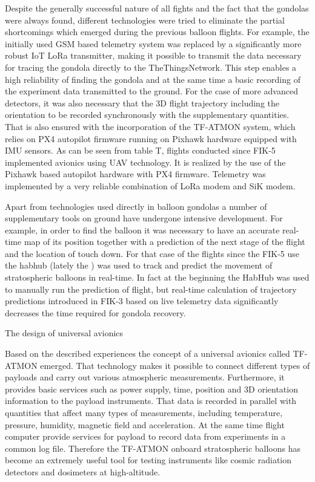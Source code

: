 Despite the generally successful nature of all fights and the fact that the gondolas were always found, different technologies were tried to eliminate the partial shortcomings which emerged during the previous balloon flights. For example, the initially used GSM based telemetry system was replaced by a significantly more robust IoT LoRa transmitter, making it possible to transmit the data necessary for tracing the gondola directly to the TheThingsNetwork. This step enables a high reliability of finding the gondola and at the same time a basic recording of the experiment data transmitted to the ground. For the case of more advanced detectors, it was also necessary that the 3D flight trajectory including the orientation to be recorded synchronously with the supplementary quantities. That is also ensured with the incorporation of the TF-ATMON system, which relies on PX4 autopilot firmware running on Pixhawk hardware equipped with IMU sensors. As can be seen from table T, flights conducted since FIK-5 implemented avionics using UAV technology. It is realized by the use of the Pixhawk based autopilot hardware with PX4 firmware. Telemetry was implemented by a very reliable combination of LoRa modem and SiK modem. 

Apart from technologies used directly in balloon  gondolas a number of supplementary tools on ground have undergone intensive development. For example, in order to find the balloon it was necessary to have an accurate real-time map of its position together with a prediction of the next stage of the flight and the location of touch down. For that case of the flights since the FIK-5 use the habhub  (lately the ) was used to track and predict the movement of stratospheric balloons in real-time. In fact at the beginning the HabHub was used to manually run the prediction of flight, but real-time calculation of trajectory predictions introduced in FIK-3 based on live telemetry data significantly decreases the time required for gondola recovery. 

\secc The design of universal avionics

Based on the described experiences the concept of a universal avionics called TF-ATMON emerged. That technology makes it possible to connect different types of payloads and carry out various atmospheric measurements. Furthermore, it provides basic services such as power supply, time, position and 3D orientation information to the payload instruments. That data is recorded in parallel with quantities that affect many types of measurements, including temperature, pressure, humidity, magnetic field and acceleration. At the same time flight computer provide services for payload to record data from experiments in a common log file. 
Therefore the TF-ATMON onboard stratospheric balloons has become an extremely useful tool for testing instruments like cosmic radiation detectors and dosimeters at high-altitude.

